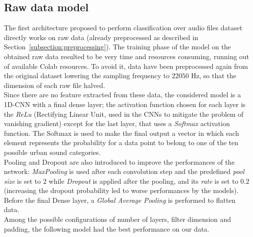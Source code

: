 \documentclass[oneside,openany]{article}
\begin{document}
    \subsection{Raw data model}
    \label{subsection:raw_model}
    The first architecture proposed to perform classification over audio files dataset directly works on raw data (already preprocessed as described in Section~\ref{subsection:preprocessing}). The training phase of the model on the obtained raw data resulted to be very time and resources consuming, running out of available Colab resources. To avoid it, data have been preprocessed again from the original dataset lowering the sampling frequency to $22050$ Hz, so that the dimension of each raw file halved.\\
    Since there are no feature extracted from these data, the considered model is a 1D-CNN with a final dense layer; the activation function chosen for each layer is the \textit{ReLu} (Rectifying Linear Unit, used in the CNNs to mitigate the problem of vanishing gradient) except for the last layer, that uses a \textit{Softmax} activation function. The Softmax is used to make the final output a vector in which each element represents the probability for a data point to belong to one of the ten possible urban sound categories.\\
    Pooling and Dropout are also introduced to improve the performances of the network: \textit{MaxPooling} is used after each convolution step and the predefined \textit{pool size} is set to $2$ while \textit{Dropout} is applied after the pooling, and its \textit{rate} is set to $0.2$ (increasing the dropout probability led to worse performances by the models).\\
    Before the final Dense layer, a \textit{Global Average Pooling} is performed to flatten data.\\
    Among the possible configurations of number of layers, filter dimension and padding, the following model had the best performance on our data.
\end{document}
